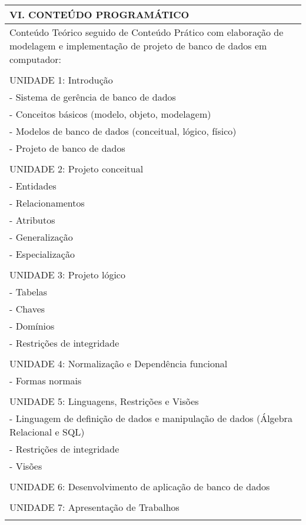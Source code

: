 \documentclass[12pt]{article}
\begin{document}
\begin{longtable}{|L{1.025\textwidth}|} \hline
%
{\bf VI. CONTEÚDO PROGRAMÁTICO } \\ \hline
Conteúdo Teórico seguido de Conteúdo Prático com elaboração de modelagem e implementação de projeto de banco de dados em computador: \\
\\
UNIDADE 1: Introdução\\
- Sistema de gerência de banco de dados\\
- Conceitos básicos (modelo, objeto, modelagem)\\
- Modelos de banco de dados (conceitual, lógico, físico)\\
- Projeto de banco de dados\\
\\
UNIDADE 2: Projeto conceitual\\
- Entidades\\
- Relacionamentos\\
- Atributos\\
- Generalização\\
- Especialização\\
\\
UNIDADE 3: Projeto lógico\\
- Tabelas\\
- Chaves\\
- Domínios\\
- Restrições de integridade\\
\\
UNIDADE 4: Normalização e Dependência funcional\\
- Formas normais\\
\\
UNIDADE 5: Linguagens, Restrições e Visões\\
- Linguagem de definição de dados e manipulação de dados (Álgebra Relacional e SQL)\\
- Restrições de integridade\\
- Visões\\
\\
UNIDADE 6: Desenvolvimento de aplicação de banco de dados\\
\\
UNIDADE 7: Apresentação de Trabalhos\\


\\ \hline
\end{longtable} 
\end{document}
